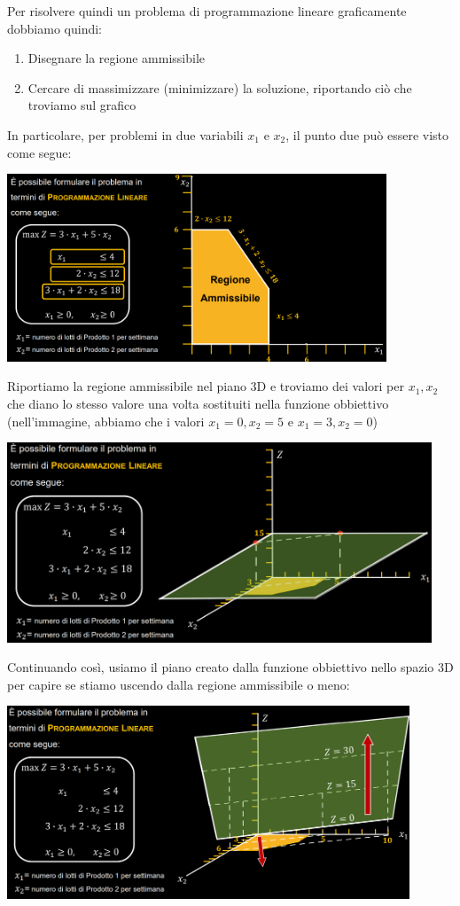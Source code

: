 \documentclass[12pt]{article}
\begin{document}
Per risolvere quindi un problema di programmazione lineare graficamente dobbiamo quindi:
\begin{enumerate}
    \item Disegnare la regione ammissibile
    \item Cercare di massimizzare (minimizzare) la soluzione, riportando ciò che troviamo sul grafico
\end{enumerate}
In particolare, per problemi in due variabili $x_1$ e $x_2$, il punto due può essere visto come segue:
\begin{center}
    \includegraphics[width = 0.85\textwidth]{Images/13.png}
\end{center}
Riportiamo la regione ammissibile nel piano 3D e troviamo dei valori per $x_1, x_2$ che diano lo stesso valore
una volta sostituiti nella funzione obbiettivo (nell'immagine, abbiamo che i valori $x_1 = 0, x_2 = 5$ e $x_1 = 3, x_2 = 0$)
\begin{center}
    \includegraphics[width = 0.95\textwidth]{Images/14.png}
\end{center}
Continuando così, usiamo il piano creato dalla funzione obbiettivo nello spazio 3D per capire se stiamo uscendo dalla regione ammissibile o meno:
\begin{center}
    \includegraphics[width = 0.90\textwidth]{Images/15.png}
\end{center}
\end{document}
